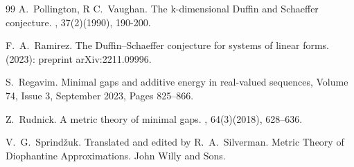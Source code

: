 \documentclass[12pt,article]{amsart}
\theoremstyle{remark}
\numberwithin{equation}{section}
\begin{document}
\begin{thebibliography}{99}
		A.~Pollington, R C.~Vaughan. 
		\newblock The k-dimensional Duffin and Schaeffer conjecture.
		, 37(2)(1990), 190-200. 
		
		F.~A.~Ramirez.
		\newblock The Duffin--Schaeffer conjecture for systems of linear forms.
		\newblock (2023): preprint arXiv:2211.09996.
		
		S.~Regavim.
		\newblock Minimal gaps and additive energy in real-valued sequences, 
		Volume 74, Issue 3, September 2023, Pages 825–866.
		
		Z.~Rudnick.
		\newblock A metric theory of minimal gaps.
		, 64(3)(2018), 628--636.
		
		V.~G.~Sprind\v{z}uk. Translated and edited by R.~A.~Silverman. 
		\newblock Metric Theory of Diophantine Approximations.
		\newblock John Willy and Sons.
	\end{thebibliography}
	
\end{document}
